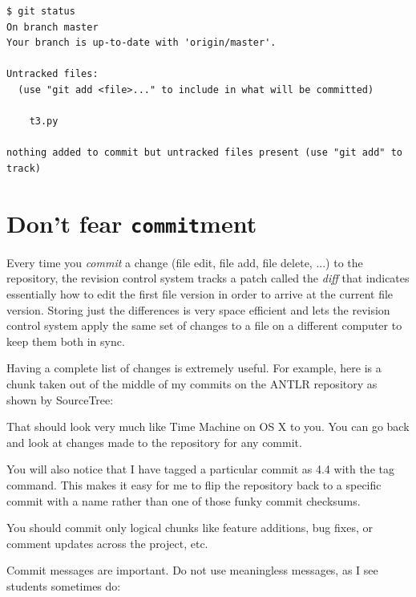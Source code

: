 \begin{lstlisting}[style=BashInputStyle]
$ git status
On branch master
Your branch is up-to-date with 'origin/master'.

Untracked files:
  (use "git add <file>..." to include in what will be committed)

    t3.py

nothing added to commit but untracked files present (use "git add" to track)
\end{lstlisting}

\section{Don't fear {\tt commit}ment}

Every time you {\em commit} a change (file edit, file add, file delete, ...) to the repository, the revision control system tracks a patch called the {\em diff} that indicates essentially how to edit the first file version in order to arrive at the current file version. Storing just the differences is very space efficient and  lets the revision control system apply the same set of changes to a file on a different computer to keep them both in sync.  

Having a complete list of changes is extremely useful. For example, here is a chunk taken out of the middle of my commits on the ANTLR repository as shown by SourceTree:


That should look very much like Time Machine on OS X to you. You can go back and look at changes made to the repository for any commit.

You will also notice that I have tagged a particular commit as 4.4 with the tag command. This makes it easy for me to flip the repository back to a specific commit with a name rather than one of those funky commit checksums.

You should commit only logical chunks like feature additions, bug fixes, or comment updates across the project, etc.

Commit messages are important. Do not use meaningless messages, as I see students sometimes do:

